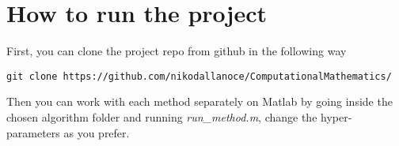 \section{How to run the project}\label{sec:how_to_run_project}
First, you can clone the project repo from github in the following way
\begin{verbatim}
git clone https://github.com/nikodallanoce/ComputationalMathematics/
\end{verbatim}
Then you can work with each method separately on Matlab by going inside the chosen algorithm folder and running \textit{run\_method.m}, change the hyper-parameters as you prefer.
